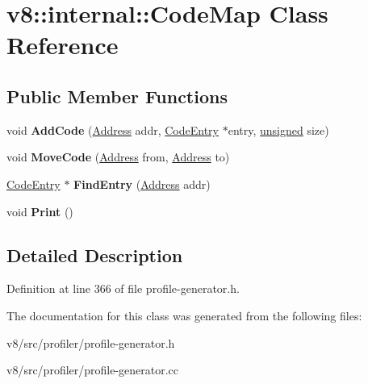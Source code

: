 \hypertarget{classv8_1_1internal_1_1CodeMap}{}\section{v8\+:\+:internal\+:\+:Code\+Map Class Reference}
\label{classv8_1_1internal_1_1CodeMap}
\subsection*{Public Member Functions}
\begin{DoxyCompactItemize}
\item 
\mbox{\label{classv8_1_1internal_1_1CodeMap_a09abba5047e41a0f239c14ac12e7dcb1}} 
void {\bfseries Add\+Code} (\mbox{\hyperlink{classuintptr__t}{Address}} addr, \mbox{\hyperlink{classv8_1_1internal_1_1CodeEntry}{Code\+Entry}} $\ast$entry, \mbox{\hyperlink{classunsigned}{unsigned}} size)
\item 
\mbox{\label{classv8_1_1internal_1_1CodeMap_a9f88e4c00aa5ff6288414fbdfcad9372}} 
void {\bfseries Move\+Code} (\mbox{\hyperlink{classuintptr__t}{Address}} from, \mbox{\hyperlink{classuintptr__t}{Address}} to)
\item 
\mbox{\label{classv8_1_1internal_1_1CodeMap_ad5a1529489d15830f1f18dac285c73a3}} 
\mbox{\hyperlink{classv8_1_1internal_1_1CodeEntry}{Code\+Entry}} $\ast$ {\bfseries Find\+Entry} (\mbox{\hyperlink{classuintptr__t}{Address}} addr)
\item 
\mbox{\label{classv8_1_1internal_1_1CodeMap_a452c676567eb04e227bd0ee4ba1a090d}} 
void {\bfseries Print} ()
\end{DoxyCompactItemize}


\subsection{Detailed Description}


Definition at line 366 of file profile-\/generator.\+h.



The documentation for this class was generated from the following files\+:\begin{DoxyCompactItemize}
\item 
v8/src/profiler/profile-\/generator.\+h\item 
v8/src/profiler/profile-\/generator.\+cc\end{DoxyCompactItemize}
